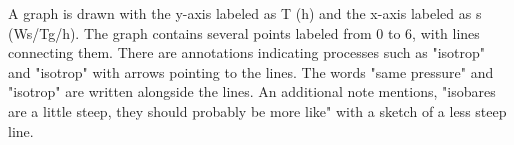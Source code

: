 A graph is drawn with the y-axis labeled as T (h) and the x-axis labeled as s (Ws/Tg/h). The graph contains several points labeled from 0 to 6, with lines connecting them. There are annotations indicating processes such as "isotrop" and "isotrop" with arrows pointing to the lines. The words "same pressure" and "isotrop" are written alongside the lines. An additional note mentions, "isobares are a little steep, they should probably be more like" with a sketch of a less steep line.